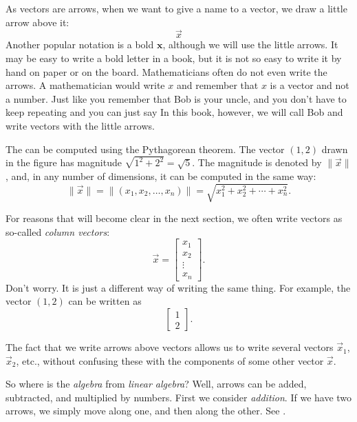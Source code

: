 As vectors are arrows, when we want to give a name to a vector,
we draw a little arrow above it:
\begin{equation*}
\vec{x}
\end{equation*}
Another popular notation is a bold $\mathbf{x}$, although we will use the little
arrows.  It may be easy to write a bold letter in a book, but it is not so
easy to write it by hand on paper or on the board.
Mathematicians often do not even write the arrows.  A mathematician would
write $x$ and remember that $x$ is a vector and not a number.
Just like you remember that Bob is your uncle, and you don't have to
keep repeating  and you can just say 
In this book, however, we will call Bob 
and write vectors with the little arrows.

The \emph{} can be computed using the Pythagorean theorem.
The vector $(1,2)$ drawn in the figure has magnitude $\sqrt{1^2+2^2} =
\sqrt{5}$.  The magnitude is denoted by $\lVert \vec{x} \rVert$,
and, in any number of dimensions, it can be computed in the same way:
\begin{equation*}
\lVert \vec{x} \rVert
=
\lVert (x_1,x_2,\ldots,x_n) \rVert
=
\sqrt{x_1^2+x_2^2+\cdots+x_n^2} .
\end{equation*}

For reasons that will become clear in the next section, we often
write vectors as so-called
\emph{column vectors}:
\begin{equation*}
\vec{x} = 
\begin{bmatrix}
x_{1} \\ x_2 \\ \vdots \\ x_n
\end{bmatrix} .
\end{equation*}
Don't worry.  It is just a different way of writing the same thing.
For example, the vector $(1,2)$ can be written as
\begin{equation*}
\begin{bmatrix}
1 \\ 2
\end{bmatrix} .
\end{equation*}

The fact that we write arrows above vectors allows us to write several
vectors $\vec{x}_1$, $\vec{x}_2$, etc., without confusing these with the
components of some other vector $\vec{x}$.

So where is the \emph{algebra} from \emph{linear algebra}?
Well, arrows can be added, subtracted,
and multiplied by numbers.
First we consider \emph{addition}.
If we have two arrows, we simply
move along one, and then along the other.  See
.

